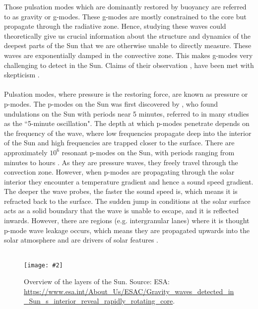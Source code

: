 \documentclass[12pt]{ociamthesis}
\newcommand{\mfig}[4]{
  \begin{figure}
  \begin{center}
  \texttt{[image: \#2]}
  \caption{#3}
  \label{#4}
  \end{center}
  \end{figure}}
\newcommand{\np}{\\ \\}
\begin{document}
%
Those pulsation modes which are dominantly restored by buoyancy are referred to as gravity or g-modes. These g-modes are mostly constrained to the core but propagate through the radiative zone. Hence, studying these waves could theoretically give us crucial information about the structure and dynamics of the deepest parts of the Sun that we are otherwise unable to directly measure. These waves are exponentially damped in the convective zone. This makes g-modes very challenging to detect in the Sun. Claims of their observation \citep{Garc2007Sci3161591G, Fossat2017AA604A40F, Fossat2018AA612L1F}, have been met with skepticism \citep{Appourchaux2010AARv18197A, Schunker2018SoPh29395S,Appourchaux2019AA624A106A, Scherrer2019ApJ87742S}. \np
%
Pulsation modes, where pressure is the restoring force, are known as pressure or p-modes. The p-modes on the Sun was first discovered by \cite{Leighton1962ApJ135474L}, who found undulations on the Sun with periods near 5 minutes, referred to in many studies as the ``5-minute oscillation". The depth at which p-modes penetrate depends on the frequency of the wave, where low frequencies propagate deep into the interior of the Sun and high frequencies are trapped closer to the surface. There are approximately $10^6$ resonant p-modes on the Sun, with periods ranging from minutes to hours \citep{Demarque1999PNAS965356D}. As they are pressure waves, they freely travel through the convection zone. However, when p-modes are propagating through the solar interior they encounter a temperature gradient and hence a sound speed gradient. The deeper the wave probes, the faster the sound speed is, which means it is refracted back to the surface. The sudden jump in conditions at the solar surface acts as a solid boundary that the wave is unable to escape, and it is reflected inwards. However, there are regions (e.g. intergranular lanes) where it is thought p-mode wave leakage occurs, which means they are propagated upwards into the solar atmosphere and are drivers of solar features \citep{Suematsu1990LNP367211S, Pontieu2005ApJ624L61D, Heggland2007ApJ6661277H, Pontieu2004Natur}. \np
\mfig{0.8}{figures/image10.png}{Overview of the layers of the Sun. Source: ESA: \url{https://www.esa.int/About_Us/ESAC/Gravity_waves_detected_in_Sun_s_interior_reveal_rapidly_rotating_core}.}{on_model}
\end{document}
